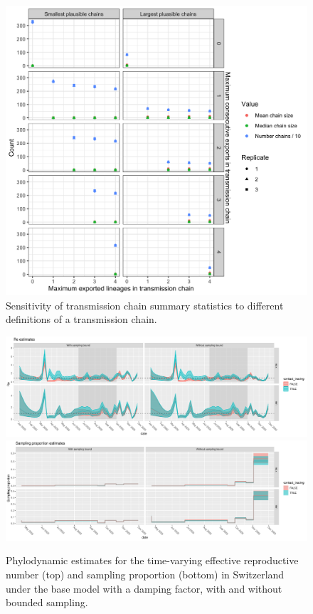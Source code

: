 \documentclass[9pt,twoside,lineno]{pnas-new}
\begin{document}
\begin{figure}
\centering
\includegraphics[width = 11.4cm]{figures/fig_SX_sensitivity_chain_defn.png}
\caption{Sensitivity of transmission chain summary statistics to different definitions of a transmission chain.}  
\label{fig:sensitivity_m_p}
\end{figure}

\begin{figure}[tbhp]
\centering
\includegraphics[width=\linewidth]{figures/bdsky_2021-08-18/Re_CHE_1deme.pdf}
\vfill
\includegraphics[width=\linewidth]{figures/bdsky_2021-08-18/sampProp_CHE_1deme.pdf}
\caption{Phylodynamic estimates for the time-varying effective reproductive number (top) and sampling proportion (bottom) in Switzerland under the base model with a damping factor, with and without bounded sampling.}  
\label{fig:1DemeCHResults}
\end{figure}
\end{document}

